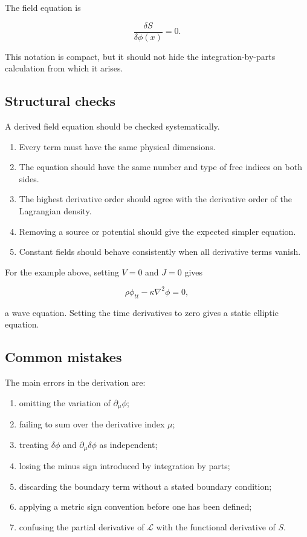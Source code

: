 The field equation is

\[
\frac{\delta S}{\delta\phi(x)}=0.
\]

This notation is compact, but it should not hide the integration-by-parts calculation from which it arises.

\subsection{Structural checks}

A derived field equation should be checked systematically.

\begin{enumerate}
    \item Every term must have the same physical dimensions.
    \item The equation should have the same number and type of free indices on both sides.
    \item The highest derivative order should agree with the derivative order of the Lagrangian density.
    \item Removing a source or potential should give the expected simpler equation.
    \item Constant fields should behave consistently when all derivative terms vanish.
\end{enumerate}

For the example above, setting \(V=0\) and \(J=0\) gives

\[
\rho\phi_{tt}-\kappa\nabla^{2}\phi=0,
\]

a wave equation. Setting the time derivatives to zero gives a static elliptic equation.

\subsection{Common mistakes}

The main errors in the derivation are:

\begin{enumerate}
    \item omitting the variation of \(\partial_{\mu}\phi\);
    \item failing to sum over the derivative index \(\mu\);
    \item treating \(\delta\phi\) and \(\partial_{\mu}\delta\phi\) as independent;
    \item losing the minus sign introduced by integration by parts;
    \item discarding the boundary term without a stated boundary condition;
    \item applying a metric sign convention before one has been defined;
    \item confusing the partial derivative of \(\mathcal{L}\) with the functional derivative of \(S\).
\end{enumerate}

